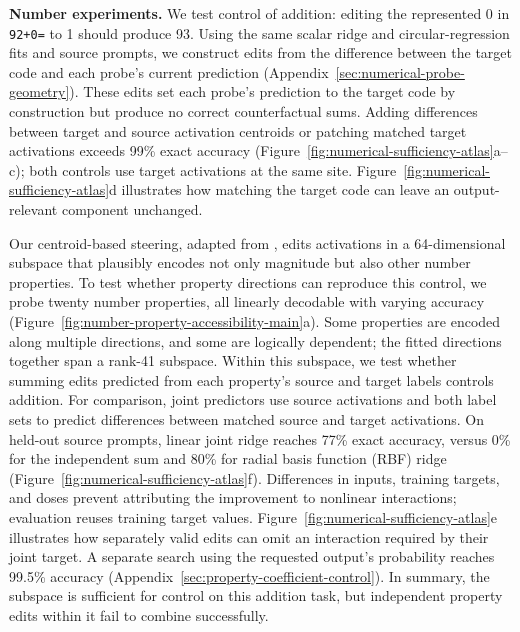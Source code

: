 \documentclass[11pt]{article}
\begin{document}
\textbf{Number experiments.} We test control of addition: editing the represented 0 in \texttt{92+0=} to 1 should produce 93.
Using the same scalar ridge and circular-regression fits and source prompts, we construct edits from the difference between the target code and each probe's current prediction (Appendix~\ref{sec:numerical-probe-geometry}).
These edits set each probe's prediction to the target code by construction but produce no correct counterfactual sums.
Adding differences between target and source activation centroids or patching matched target activations exceeds 99\% exact accuracy (Figure~\ref{fig:numerical-sufficiency-atlas}a--c); both controls use target activations at the same site.
Figure~\ref{fig:numerical-sufficiency-atlas}d illustrates how matching the target code can leave an output-relevant component unchanged.

Our centroid-based steering, adapted from \citet{wurgaft2026manifold}, edits activations in a 64-dimensional subspace that plausibly encodes not only magnitude but also other number properties.
To test whether property directions can reproduce this control, we probe twenty number properties, all linearly decodable with varying accuracy (Figure~\ref{fig:number-property-accessibility-main}a).
Some properties are encoded along multiple directions, and some are logically dependent; the fitted directions together span a rank-41 subspace.
Within this subspace, we test whether summing edits predicted from each property's source and target labels controls addition.
For comparison, joint predictors use source activations and both label sets to predict differences between matched source and target activations.
On held-out source prompts, linear joint ridge reaches 77\% exact accuracy, versus 0\% for the independent sum and 80\% for radial basis function (RBF) ridge (Figure~\ref{fig:numerical-sufficiency-atlas}f).
Differences in inputs, training targets, and doses prevent attributing the improvement to nonlinear interactions; evaluation reuses training target values.
Figure~\ref{fig:numerical-sufficiency-atlas}e illustrates how separately valid edits can omit an interaction required by their joint target.
A separate search using the requested output's probability reaches 99.5\% accuracy (Appendix~\ref{sec:property-coefficient-control}).
In summary, the subspace is sufficient for control on this addition task, but independent property edits within it fail to combine successfully.
\end{document}
